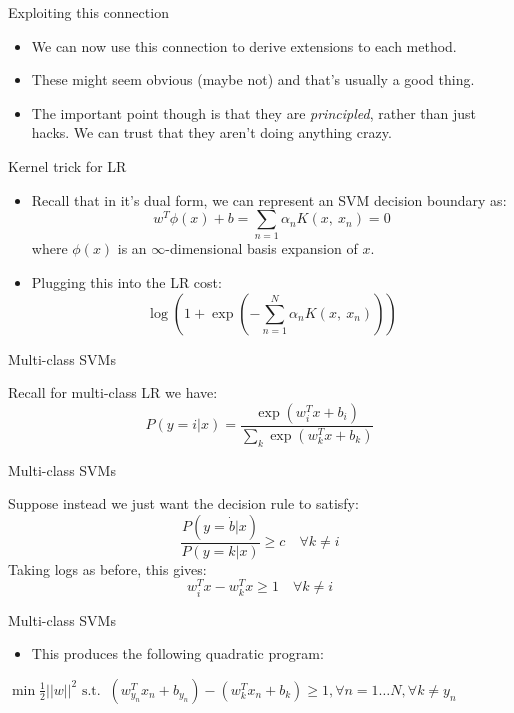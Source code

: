 \documentclass[12pt,notes,mathserif]{beamer}
\providecommand{\tightlist}{%
	\setlength{\itemsep}{0pt}\setlength{\parskip}{0pt}}
\begin{document}
\begin{frame}{Exploiting this connection}

\begin{itemize}
\item
  We can now use this connection to derive extensions to each method.
\item
  These might seem obvious (maybe not) and that's usually a good thing.
\item
  The important point though is that they are \emph{principled}, rather
  than just hacks. We can trust that they aren't doing anything crazy.
\end{itemize}

\end{frame}

\begin{frame}{Kernel trick for LR}

\begin{itemize}
\item
  Recall that in it's dual form, we can represent an SVM decision
  boundary as: \[
  w^{T}\phi(x)+b=\sum_{n=1}\alpha_{n}K(x,\ x_{n})=0
  \] where \(\phi(x)\) is an \(\infty\)-dimensional basis expansion of
  \(x.\)
\item
  Plugging this into the LR cost: \[
  \log(1+\exp(-\sum_{n=1}^{N}\alpha_{n}K(x,\ x_{n})))
  \]
\end{itemize}

\end{frame}

\begin{frame}{Multi-class SVMs}

Recall for multi-class LR we have: \[
P(y=i|x)=\frac{\exp(w_{i}^{T}x+b_{i})}{\sum_{k}\exp(w_{k}^{T}x+b_{k})}
\]

\end{frame}

\begin{frame}{Multi-class SVMs}

Suppose instead we just want the decision rule to satisfy: \[
\frac{P(y=\dot{b}|x)}{P(y=k|x)}\geq c \quad \forall k\neq i
\] Taking logs as before, this gives: \[
w_{i}^{T}x-w_{k}^{T}x\geq 1 \quad \forall k\neq i
\]

\end{frame}

\begin{frame}{Multi-class SVMs}

\begin{itemize}
\tightlist
\item
  This produces the following quadratic program:
\end{itemize}

\(\displaystyle \min \displaystyle \frac{1}{2}||w||^{2}\)
\(\textrm{s.t. }\ (w_{y_{n}}^{T}x_{n}+b_{y_{n}})-(w_{k}^{T}x_{n}+b_{k})\geq 1, \forall n=1\ldots N, \forall k\neq y_{n}\)

\end{frame}
\end{document}
